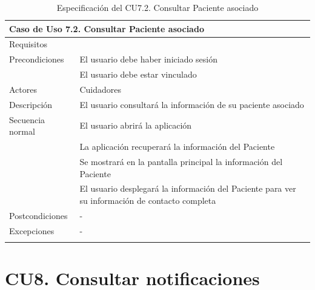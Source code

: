 \begin{longtable}{|p{} p{}|}
    \hline
    \multicolumn{2}{|l|}{\textbf{Caso de Uso 7.2. Consultar Paciente asociado}} \\ \hline \hline
    Requisitos          & {req:consultar_info_paciente} \\ \hline
    Precondiciones      & El usuario debe haber iniciado sesión \\
                        & El usuario debe estar vinculado \\ \hline
    Actores             & Cuidadores \\ \hline
    Descripción         & El usuario consultará la información de su paciente asociado \\ \hline
    Secuencia normal    & El usuario abrirá la aplicación \\
                        & La aplicación recuperará la información del Paciente \\
                        & Se mostrará en la pantalla principal la información del Paciente \\
                        & El usuario desplegará la información del Paciente para ver su información de contacto completa \\ \hline
    Postcondiciones     & - \\ \hline
    Excepciones         & - \\ \hline
    \caption{Especificación del CU7.2. Consultar Paciente asociado}
    \label{cu:consultar_paciente}
\end{longtable}

\section{CU8. Consultar notificaciones}

